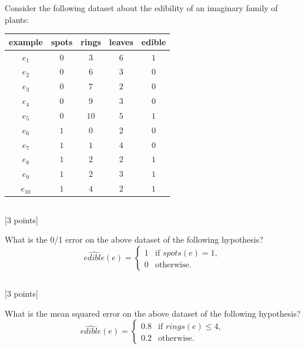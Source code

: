 \documentclass[12pt]{article}
\newcommand{\tcv}[1]{\textcolor{m4}{#1}}
\newcounter{totalpoints}
\newcommand{\points}[1]{{\addtocounter{totalpoints}{#1}\tcv{[#1 points]}}}
\begin{document}
{Consider the following dataset about the edibility of an imaginary family of plants:
\begin{center}
    \begin{tabular}{c|cccc}
        \toprule
        example & spots & rings & leaves & edible\\
        \midrule
        $e_1$ & $0$ & $3$  & $6$ & $1$ \\        
        $e_2$ & $0$ & $6$  & $3$ & $0$ \\
        $e_3$ & $0$ & $7$  & $2$ & $0$ \\
        $e_4$ & $0$ & $9$ & $3$ & $0$ \\
        $e_5$ & $0$ & $10$ & $5$ & $1$ \\
        $e_6$ & $1$ & $0$  & $2$ & $0$ \\
        $e_7$ & $1$ & $1$  & $4$ & $0$ \\
        $e_8$ & $1$ & $2$  & $2$ & $1$ \\
        $e_9$ & $1$ & $2$  & $3$ & $1$ \\
        $e_{10}$ & $1$ & $4$  & $2$ & $1$ \\
        \bottomrule
    \end{tabular}
\end{center}

\subsection{} 
\points{3}
    What is the 0/1 error on the above dataset of the following hypothesis?
    \[\widehat{edible}(e) = \begin{cases}
                              1 &\text{if } spots(e) = 1,\\
                              0 &\text{otherwise.}
                            \end{cases}\]
    
\begin{answer}{1in}
\end{answer}
    
    \subsection{} \points{3}
    What is the mean squared error on the above dataset of the following hypothesis?
    \[\widehat{edible}(e) = \begin{cases}
                              0.8 &\text{if } rings(e) \le 4,\\
                              0.2 &\text{otherwise.}
                            \end{cases}\]
    
}
\end{document}
